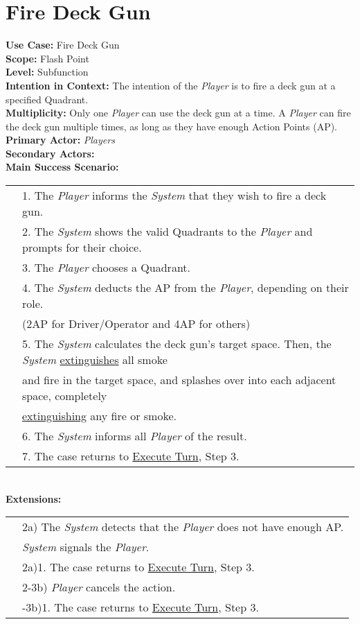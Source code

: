 \documentclass{article}
\begin{document}
	\section*{Fire Deck Gun}
	\textbf{Use Case:} Fire Deck Gun\\
	\textbf{Scope:} Flash Point\\
	\textbf{Level:} Subfunction\\
	\textbf{Intention in Context:} The intention of the \textit{Player} is to fire a deck gun at a specified Quadrant.\\
	\textbf{Multiplicity: }Only one \textit{Player} can use the deck gun at a time. A \textit{Player} can fire the deck gun multiple times, as long as they have enough Action Points (AP).\\
	\textbf{Primary Actor:} \textit{Players}\\
	\textbf{Secondary Actors:}\\
	\textbf{Main Success Scenario:}\\
	\begin{tabular}{l l}
		&1. The \textit{Player} informs the \textit{System} that they wish to fire a deck gun.\\
		&2. The \textit{System} shows the valid Quadrants to the \textit{Player} and prompts for their choice.\\
		&3. The \textit{Player} chooses a Quadrant.\\
		&4. The \textit{System} deducts the AP from the \textit{Player}, depending on their role.\\
		&\qquad (2AP for Driver/Operator and 4AP for others)\\
		&5. The \textit{System} calculates the deck gun’s target space. Then, the \textit{System} \underline{extinguishes} all smoke\\
		&\qquad and fire in the target space, and splashes over into each adjacent space, completely\\ &\qquad\underline{extinguishing} any fire or smoke.\\
		&6. The \textit{System} informs all \textit{Player} of the result.\\
		&7. The case returns to \underline{Execute Turn}, Step 3.
	\end{tabular}\\
	\textbf{Extensions:}\\
	\begin{tabular}{l l}
		&2a) The \textit{System} detects that the \textit{Player} does not have enough AP.\\ &\qquad\textit{System} signals the \textit{Player}.\\
		&\qquad2a)1. The case returns to \underline{Execute Turn}, Step 3.\\
		&2-3b) \textit{Player} cancels the action.\\
		&\qquad2-3b)1. The case returns to \underline{Execute Turn}, Step 3.
	\end{tabular}\\
	
\end{document}
